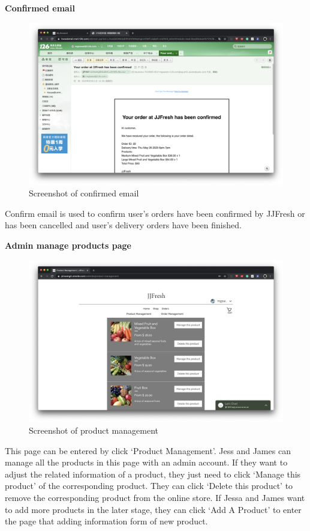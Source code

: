 \clearpage
\textbf{Confirmed email}
\begin{figure}[htp]
\centering
\includegraphics[width=\textwidth]{Figures/confirmedEmail.png}
\caption{Screenshot of confirmed email}
\label{fig:confirmedEmail}
\end{figure}

Confirm email is used to confirm user’s orders have been confirmed by JJFresh or has been cancelled and user’s delivery orders have been finished.

\clearpage
\textbf{Admin manage products page}
\begin{figure}[htp]
\centering
\includegraphics[width=\textwidth]{Figures/adminProduct.png}
\caption{Screenshot of product management}
\label{fig:adminProduct}
\end{figure}

This page can be entered by click ‘Product Management’. Jess and James can manage all the products in this page with an admin account. If they want to adjust the related information of a product, they just need to click ‘Manage this product’ of the corresponding product. They can click ‘Delete this product’ to remove the corresponding product from the online store.
If Jessa and James want to add more products in the later stage, they can click ‘Add A Product’ to enter the page that adding information form of new product.

